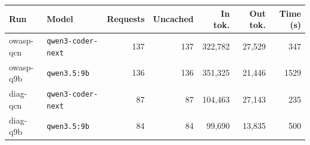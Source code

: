 \begin{tabular}{llrrrrr}
\toprule
Run & Model & Requests & Uncached & In tok. & Out tok. & Time (s) \\
\midrule
owasp-qcn & \texttt{qwen3-coder-next} & 137 & 137 & 322,782 & 27,529 & 347 \\
owasp-q9b & \texttt{qwen3.5:9b} & 136 & 136 & 351,325 & 21,446 & 1529 \\
diag-qcn & \texttt{qwen3-coder-next} & 87 & 87 & 104,463 & 27,143 & 235 \\
diag-q9b & \texttt{qwen3.5:9b} & 84 & 84 & 99,690 & 13,835 & 500 \\
\bottomrule
\end{tabular}
